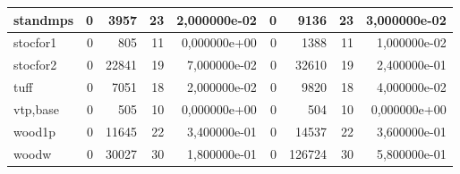 \begin{tabular}{|l|r|r|r|r|r|r|r|r|}
standmps & 0 & 3957 & 23 & 2,000000e-02 & 0 & 9136 & 23 & 3,000000e-02 \\ \hline
stocfor1 & 0 & 805 & 11 & 0,000000e+00 & 0 & 1388 & 11 & 1,000000e-02 \\ \hline
stocfor2 & 0 & 22841 & 19 & 7,000000e-02 & 0 & 32610 & 19 & 2,400000e-01 \\ \hline
tuff & 0 & 7051 & 18 & 2,000000e-02 & 0 & 9820 & 18 & 4,000000e-02 \\ \hline
vtp,base & 0 & 505 & 10 & 0,000000e+00 & 0 & 504 & 10 & 0,000000e+00 \\ \hline
wood1p & 0 & 11645 & 22 & 3,400000e-01 & 0 & 14537 & 22 & 3,600000e-01 \\ \hline
woodw & 0 & 30027 & 30 & 1,800000e-01 & 0 & 126724 & 30 & 5,800000e-01 \\ \hline
\end{tabular}
